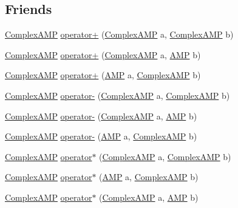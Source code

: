 \subsection*{Friends}
\begin{DoxyCompactItemize}
\item 
\hyperlink{class_complex_a_m_p}{Complex\+A\+M\+P} \hyperlink{class_complex_a_m_p_aca16873efb5c7084a95fdf24b1520f6a}{operator+} (\hyperlink{class_complex_a_m_p}{Complex\+A\+M\+P} a, \hyperlink{class_complex_a_m_p}{Complex\+A\+M\+P} b)
\item 
\hyperlink{class_complex_a_m_p}{Complex\+A\+M\+P} \hyperlink{class_complex_a_m_p_ae144e4785937e0f8bd56298beae88b3e}{operator+} (\hyperlink{class_complex_a_m_p}{Complex\+A\+M\+P} a, \hyperlink{class_a_m_p}{A\+M\+P} b)
\item 
\hyperlink{class_complex_a_m_p}{Complex\+A\+M\+P} \hyperlink{class_complex_a_m_p_aa28655296a329cc803c538de4a30e190}{operator+} (\hyperlink{class_a_m_p}{A\+M\+P} a, \hyperlink{class_complex_a_m_p}{Complex\+A\+M\+P} b)
\item 
\hyperlink{class_complex_a_m_p}{Complex\+A\+M\+P} \hyperlink{class_complex_a_m_p_ae116303de5549df76b2d9f2879275b97}{operator-\/} (\hyperlink{class_complex_a_m_p}{Complex\+A\+M\+P} a, \hyperlink{class_complex_a_m_p}{Complex\+A\+M\+P} b)
\item 
\hyperlink{class_complex_a_m_p}{Complex\+A\+M\+P} \hyperlink{class_complex_a_m_p_abea240d92014f571fe457c45545f1cb1}{operator-\/} (\hyperlink{class_complex_a_m_p}{Complex\+A\+M\+P} a, \hyperlink{class_a_m_p}{A\+M\+P} b)
\item 
\hyperlink{class_complex_a_m_p}{Complex\+A\+M\+P} \hyperlink{class_complex_a_m_p_ab6519c4c4cc3946197702624fd2f7702}{operator-\/} (\hyperlink{class_a_m_p}{A\+M\+P} a, \hyperlink{class_complex_a_m_p}{Complex\+A\+M\+P} b)
\item 
\hyperlink{class_complex_a_m_p}{Complex\+A\+M\+P} \hyperlink{class_complex_a_m_p_a698b9299c47283711cfb6123e564532e}{operator$\ast$} (\hyperlink{class_complex_a_m_p}{Complex\+A\+M\+P} a, \hyperlink{class_complex_a_m_p}{Complex\+A\+M\+P} b)
\item 
\hyperlink{class_complex_a_m_p}{Complex\+A\+M\+P} \hyperlink{class_complex_a_m_p_a768086a02c3485f6b9c66658a0146981}{operator$\ast$} (\hyperlink{class_a_m_p}{A\+M\+P} a, \hyperlink{class_complex_a_m_p}{Complex\+A\+M\+P} b)
\item 
\hyperlink{class_complex_a_m_p}{Complex\+A\+M\+P} \hyperlink{class_complex_a_m_p_a099f6f31d034e1e9804b2f9214c6df2d}{operator$\ast$} (\hyperlink{class_complex_a_m_p}{Complex\+A\+M\+P} a, \hyperlink{class_a_m_p}{A\+M\+P} b)

\end{DoxyCompactItemize}
